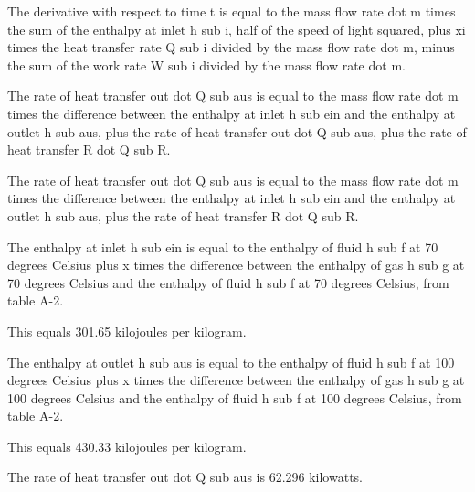 The derivative with respect to time t is equal to the mass flow rate dot m times the sum of the enthalpy at inlet h sub i, half of the speed of light squared, plus xi times the heat transfer rate Q sub i divided by the mass flow rate dot m, minus the sum of the work rate W sub i divided by the mass flow rate dot m.

The rate of heat transfer out dot Q sub aus is equal to the mass flow rate dot m times the difference between the enthalpy at inlet h sub ein and the enthalpy at outlet h sub aus, plus the rate of heat transfer out dot Q sub aus, plus the rate of heat transfer R dot Q sub R.

The rate of heat transfer out dot Q sub aus is equal to the mass flow rate dot m times the difference between the enthalpy at inlet h sub ein and the enthalpy at outlet h sub aus, plus the rate of heat transfer R dot Q sub R.

The enthalpy at inlet h sub ein is equal to the enthalpy of fluid h sub f at 70 degrees Celsius plus x times the difference between the enthalpy of gas h sub g at 70 degrees Celsius and the enthalpy of fluid h sub f at 70 degrees Celsius, from table A-2.

This equals 301.65 kilojoules per kilogram.

The enthalpy at outlet h sub aus is equal to the enthalpy of fluid h sub f at 100 degrees Celsius plus x times the difference between the enthalpy of gas h sub g at 100 degrees Celsius and the enthalpy of fluid h sub f at 100 degrees Celsius, from table A-2.

This equals 430.33 kilojoules per kilogram.

The rate of heat transfer out dot Q sub aus is 62.296 kilowatts.